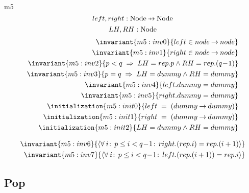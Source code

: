 \documentclass[12pt]{amsart}
\begin{document}
\begin{machine}{m5}
  \[ \variable{ left, right : \Node \pfun \Node } \]
  \[  LH, RH : \text{Node}  \]
  \begin{align}
    \invariant{m5:inv0}{ left \in node \tfun node } \\
    \invariant{m5:inv1}{ right \in node \tfun node }  \\
    \invariant{m5:inv2}
      { p < q \1\implies LH = rep.p \land RH = rep.(q\0-1) }  \\
    \invariant{m5:inv3}
      { p = q \1\implies LH = dummy \land RH = dummy }  \\
    \invariant{m5:inv4}{ left.dummy = dummy }  \\
    \invariant{m5:inv5}{ right.dummy = dummy }  \\
    \initialization{m5:init0}{ left \1= (dummy \fun dummy) } \\
    \initialization{m5:init1}{ right \1= (dummy \fun dummy) } \\
    \initialization{m5:init2}{ LH = dummy \land RH = dummy }
  \end{align}

  \begin{align}
    \invariant{m5:inv6}
      { \qforall{i}{\betweenR{p}{i}{q\0-1}}{ right.(rep.i) = rep.(i+1) } } \\
    \invariant{m5:inv7}
      { \qforall{i}{\betweenR{p}{i}{q\0-1}}{ left.(rep.(i+1)) = rep.i } } 
  \end{align}
\subsection{Pop}

\end{machine}
\end{document}
